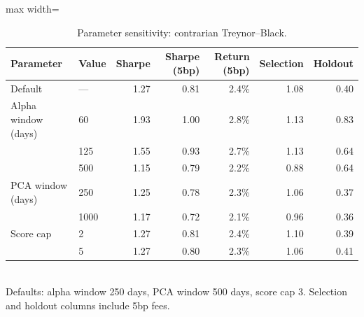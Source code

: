 \documentclass[11pt,letterpaper]{article}
\begin{document}
\begin{table}[!htbp]
\centering
\caption{Parameter sensitivity: contrarian Treynor--Black.}
\label{tab:sensitivity-tb}
\begin{adjustbox}{max width=\linewidth}
\begin{tabular}{llrrrrr}
\toprule
Parameter & Value & Sharpe & Sharpe (5bp) & Return (5bp) & Selection & Holdout \\
\midrule
Default & --- & 1.27 & 0.81 & 2.4\% & 1.08 & 0.40 \\
Alpha window (days) & 60 & 1.93 & 1.00 & 2.8\% & 1.13 & 0.83 \\
& 125 & 1.55 & 0.93 & 2.7\% & 1.13 & 0.64 \\
& 500 & 1.15 & 0.79 & 2.2\% & 0.88 & 0.64 \\
PCA window (days) & 250 & 1.25 & 0.78 & 2.3\% & 1.06 & 0.37 \\
& 1000 & 1.17 & 0.72 & 2.1\% & 0.96 & 0.36 \\
Score cap & 2 & 1.27 & 0.81 & 2.4\% & 1.10 & 0.39 \\
& 5 & 1.27 & 0.80 & 2.3\% & 1.06 & 0.41 \\
\bottomrule
\end{tabular}
\end{adjustbox}
\\[4pt]
\small Defaults: alpha window 250 days, PCA window 500 days, score cap 3. Selection and holdout columns include 5bp fees.
\end{table}
\end{document}
